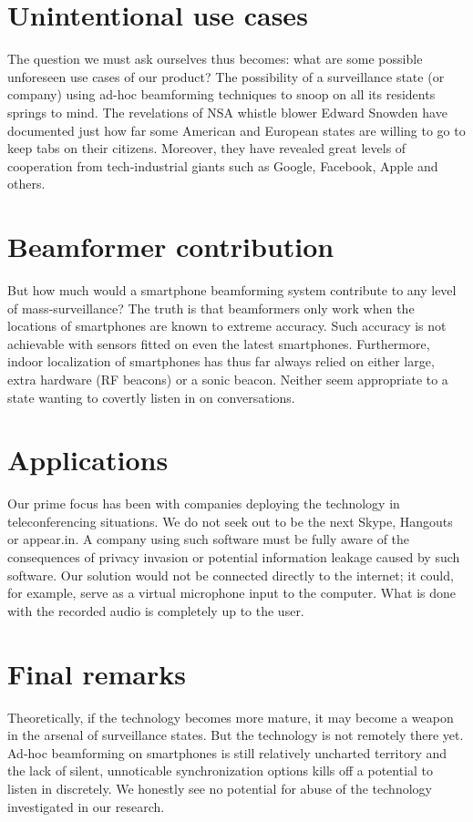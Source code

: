 \documentclass[a4paper, notitlepage]{report}
\begin{document}
\section*{Unintentional use cases}
The question we must ask ourselves thus becomes: what are some possible unforeseen use cases of our product? The possibility of a surveillance state (or company) using ad-hoc beamforming techniques to snoop on all its residents springs to mind. The revelations of NSA whistle blower Edward Snowden have documented just how far some American and European states are willing to go to keep tabs on their citizens. Moreover, they have revealed great levels of cooperation from tech-industrial giants such as Google, Facebook, Apple and others.

\section*{Beamformer contribution}
But how much would a smartphone beamforming system contribute to any level of mass-surveillance? The truth is that beamformers only work when the locations of smartphones are known to extreme accuracy. Such accuracy is not achievable with sensors fitted on even the latest smartphones. Furthermore, indoor localization of smartphones has thus far always relied on either large, extra hardware (RF beacons) or a sonic beacon. Neither seem appropriate to a state wanting to covertly listen in on conversations.

\section*{Applications}
Our prime focus has been with companies deploying the technology in teleconferencing situations. We do not seek out to be the next Skype, Hangouts or appear.in. A company using such software must be fully aware of the consequences of privacy invasion or potential information leakage caused by such software. Our solution would not be connected directly to the internet; it could, for example, serve as a virtual microphone input to the computer. What is done with the recorded audio is completely up to the user. 

\section*{Final remarks}
Theoretically, if the technology becomes more mature, it may become a weapon in the arsenal of surveillance states. But the technology is not remotely there yet. Ad-hoc beamforming on smartphones is still relatively uncharted territory and the lack of silent, unnoticable synchronization options kills off a potential to listen in discretely.
We honestly see no potential for abuse of the technology investigated in our research. 
\end{document}
